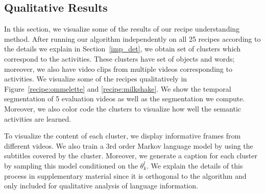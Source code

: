 \subsection{Qualitative Results}
In this section, we visualize some of  the results of our recipe understanding method. After running our algorithm independently on all 25 recipes according to the details we explain in Section~\ref{imp_det}, we obtain set of clusters which correspond to the activities. These clusters have set of objects and words; moreover, we also have video clips from multiple videos corresponding to activities. We visualize some of the recipes qualitatively in Figure~\ref{recipe:ommelette} and \ref{recipe:milkshake}. We show the temporal segmentation of 5 evaluation videos as well as the segmentation we compute. Moreover, we also color code the clusters to visualize how well the semantic activities are learned.

To visualize the content of each cluster, we display informative frames from different videos. We also train a 3rd order Markov language model\cite{languageModel} by using the subtitles covered by the cluster. Moreover, we generate a caption for each cluster by sampling this model conditioned on the $\theta^l_k$. We explain the details of this process in supplementary material since it is orthogonal to the algorithm and only included for qualitative analysis of language information.

